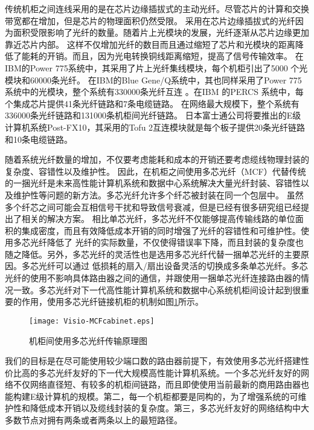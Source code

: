 传统机柜之间连线采用的是在芯片边缘插拔式的主动光纤。尽管芯片的计算和交换带宽都在增加，但是芯片的物理面积仍然受限。
采用在芯片边缘插拔式的光纤因为面积受限影响了光纤的数量。随着片上光模块的发展，光纤逐渐从芯片边缘更加靠近芯片内部。
这样不仅增加光纤的数目而且通过缩短了芯片和光模块的距离降低了能耗的开销。而且，因为光电转换铜线距离缩短，提高了信号传输效率。
在IBM的Power 775系统中，其采用了片上光纤集线模块，每个机柜引出了5000 个光模块和60000条光纤。
在IBM的Blue Gene/Q系统中，其也同样采用了Power 775系统中的光模块，整个系统有330000条光纤互连
。在IBM 的PERCS 系统中，每个集成芯片提供41条光纤链路和7条电缆链路。
在网络最大规模下，整个系统有336000条光纤链路和131000条机柜间光纤链路。
日本富士通公司将要推出的E级计算机系统Post-FX10，其采用的Tofu 2互连模块就是每个板子提供20条光纤链路和10条电缆链路。

随着系统光纤数量的增加，不仅要考虑能耗和成本的开销还要考虑缆线物理封装的复杂度、容错性以及维护性。
因此，在机柜之间使用多芯光纤（MCF）代替传统的一捆光纤是未来高性能计算机系统和数据中心系统解决大量光纤封装、容错性以及维护性等问题的新方法。多芯光纤允许多个纤芯被封装在同一个包层中。
虽然多个纤芯之间可能会互相信号干扰和导致信号衰减，但是已经有很多研究组已经提出了相关的解决方案。
 相比单芯光纤，多芯光纤不仅能够提高传输线路的单位面积的集成密度，而且有效降低成本开销的同时增强了光纤的容错性和可维护性。使用多芯光纤降低了
 光纤的实际数量，不仅使得错误率下降，而且封装的复杂度也随之降低。另外，多芯光纤的灵活性也是选用多芯光纤代替一捆单芯光纤的主要原因。多芯光纤可以通过
 低损耗的扇入/扇出设备灵活的切换成多条单芯光纤。多芯光纤的使用不影响具体路由器之间的通信，并跟使用一捆单芯光纤连接路由器的情况一致。多芯光纤对下一代高性能计算机系统和数据中心系统机柜间设计起到很重要的作用，使用多芯光纤链接机柜的机制如图\ref{mcfcabinet}所示。

 \begin{figure}[t]
  \centering
    \texttt{[image: Visio-MCFcabinet.eps]}
  \caption{机柜间使用多芯光纤传输原理图}
  \label{mcfcabinet}
\end{figure}

我们的目标是在尽可能使用较少端口数的路由器前提下，有效使用多芯光纤搭建性价比高的多芯光纤友好的下一代大规模高性能计算机系统。一个多芯光纤友好的网络不仅网络直径短、有较多的机柜间链路，而且即使使用当前最新的商用路由器也能构建E级计算机的规模。第二，每一个机柜都要是同构的，为了增强系统的可维护性和降低成本开销以及缆线封装的复杂度。第三，多芯光纤友好的网络结构中大多数节点对拥有两条或者两条以上的最短路径。

